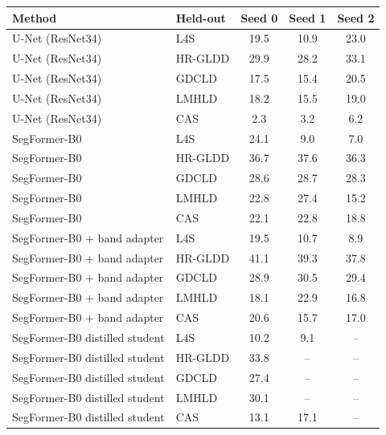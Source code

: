\begin{tabular}{llccc}
\toprule
Method & Held-out & Seed 0 & Seed 1 & Seed 2 \\
\midrule
U-Net (ResNet34) & L4S & 19.5 & 10.9 & 23.0 \\
U-Net (ResNet34) & HR-GLDD & 29.9 & 28.2 & 33.1 \\
U-Net (ResNet34) & GDCLD & 17.5 & 15.4 & 20.5 \\
U-Net (ResNet34) & LMHLD & 18.2 & 15.5 & 19.0 \\
U-Net (ResNet34) & CAS & 2.3 & 3.2 & 6.2 \\
\midrule
SegFormer-B0 & L4S & 24.1 & 9.0 & 7.0 \\
SegFormer-B0 & HR-GLDD & 36.7 & 37.6 & 36.3 \\
SegFormer-B0 & GDCLD & 28.6 & 28.7 & 28.3 \\
SegFormer-B0 & LMHLD & 22.8 & 27.4 & 15.2 \\
SegFormer-B0 & CAS & 22.1 & 22.8 & 18.8 \\
\midrule
SegFormer-B0 + band adapter & L4S & 19.5 & 10.7 & 8.9 \\
SegFormer-B0 + band adapter & HR-GLDD & 41.1 & 39.3 & 37.8 \\
SegFormer-B0 + band adapter & GDCLD & 28.9 & 30.5 & 29.4 \\
SegFormer-B0 + band adapter & LMHLD & 18.1 & 22.9 & 16.8 \\
SegFormer-B0 + band adapter & CAS & 20.6 & 15.7 & 17.0 \\
\midrule
SegFormer-B0 distilled student & L4S & 10.2 & 9.1 & -- \\
SegFormer-B0 distilled student & HR-GLDD & 33.8 & -- & -- \\
SegFormer-B0 distilled student & GDCLD & 27.4 & -- & -- \\
SegFormer-B0 distilled student & LMHLD & 30.1 & -- & -- \\
SegFormer-B0 distilled student & CAS & 13.1 & 17.1 & -- \\
\bottomrule
\end{tabular}
